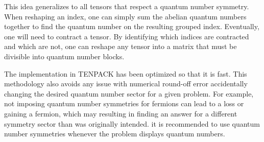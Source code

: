 \documentclass{juliacon}
\begin{document}
\begin{appendix}
This idea generalizes to all tensors that respect a quantum number symmetry. When reshaping an index, one can simply sum the abelian quantum numbers together to find the quantum number on the resulting grouped index. Eventually, one will need to contract a tensor. By identifying which indices are contracted and which are not, one can reshape any tensor into a matrix that must be divisible into quantum number blocks.

The implementation in TENPACK has been optimized so that it is fast. This methodology also avoids any issue with numerical round-off error accidentally changing the desired quantum number sector for a given problem. For example, not imposing quantum number symmetries for fermions can lead to a loss or gaining a fermion, which may resulting in finding an answer for a different symmetry sector than was originally intended. it is recommended to use quantum number symmetries whenever the problem displays quantum numbers.

\end{appendix}



\end{document}
